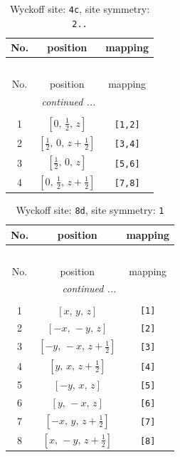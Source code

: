 \documentclass[fleqn,8pt]{jsarticle}
\begin{document}
\renewcommand{\arraystretch}{1.2}
\begin{longtable}{ccc}
\caption{Wyckoff site: {\tt 4c}, site symmetry: {\tt 2..}}
 \\
 \hline \hline
No. & position & mapping \\ \hline \endfirsthead

\multicolumn{2}{l}{\tablename\ \thetable{}} \\
 \hline \hline
No. & position & mapping \\ \hline \endhead

 \hline \hline
\multicolumn{2}{r}{\footnotesize\it continued ...} \\ \endfoot

 \hline \hline
\multicolumn{2}{r}{} \\ \endlastfoot

1 & $\left[ 0,\, \frac{1}{2},\, z \right]$ & {\tt [1,2]} \\ \hline
2 & $\left[ \frac{1}{2},\, 0,\, z + \frac{1}{2} \right]$ & {\tt [3,4]} \\ \hline
3 & $\left[ \frac{1}{2},\, 0,\, z \right]$ & {\tt [5,6]} \\ \hline
4 & $\left[ 0,\, \frac{1}{2},\, z + \frac{1}{2} \right]$ & {\tt [7,8]} \\
\end{longtable}
\renewcommand{\arraystretch}{1.2}
\begin{longtable}{ccc}
\caption{Wyckoff site: {\tt 8d}, site symmetry: {\tt 1}}
 \\
 \hline \hline
No. & position & mapping \\ \hline \endfirsthead

\multicolumn{2}{l}{\tablename\ \thetable{}} \\
 \hline \hline
No. & position & mapping \\ \hline \endhead

 \hline \hline
\multicolumn{2}{r}{\footnotesize\it continued ...} \\ \endfoot

 \hline \hline
\multicolumn{2}{r}{} \\ \endlastfoot

1 & $\left[ x,\, y,\, z \right]$ & {\tt [1]} \\ \hline
2 & $\left[ - x,\, - y,\, z \right]$ & {\tt [2]} \\ \hline
3 & $\left[ - y,\, - x,\, z + \frac{1}{2} \right]$ & {\tt [3]} \\ \hline
4 & $\left[ y,\, x,\, z + \frac{1}{2} \right]$ & {\tt [4]} \\ \hline
5 & $\left[ - y,\, x,\, z \right]$ & {\tt [5]} \\ \hline
6 & $\left[ y,\, - x,\, z \right]$ & {\tt [6]} \\ \hline
7 & $\left[ - x,\, y,\, z + \frac{1}{2} \right]$ & {\tt [7]} \\ \hline
8 & $\left[ x,\, - y,\, z + \frac{1}{2} \right]$ & {\tt [8]} \\
\end{longtable}
\end{document}
